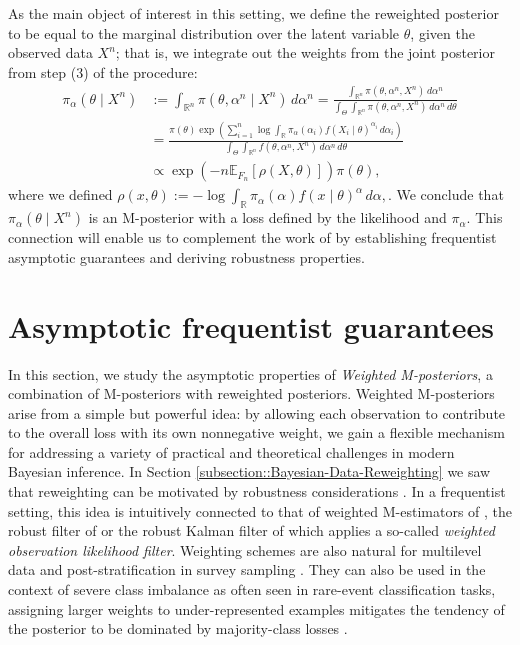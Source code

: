\documentclass[11pt, oneside]{amsart}
\theoremstyle{definition}   %
\newcommand{\R}{\mathbb{R}}
\newcommand{\loss}{\rho}
\begin{document}
%
As the main object of interest in this setting, we define the reweighted posterior to be equal to the marginal distribution over the latent variable \( \theta \), given the observed data \( X^n\); that is, we integrate out the weights from the joint posterior from step (3) of the procedure:
%
\begin{align}
\label{def::alpha-posterior}
 \nonumber   \pi_\alpha(\theta \mid X^n) &:= \int_{\R^n} \pi(\theta, \alpha^n \mid X^n) \, d\alpha^n= \frac{\int_{\R^n} \pi(\theta, \alpha^n, X^n) \, d\alpha^n }{\int_{\Theta} \int_{\R^n} \pi(\theta, \alpha^n, X^n) \, d\alpha^n \, d\theta}\\
 \nonumber &= \frac{\pi(\theta) \exp \left ( \sum_{i=1}^n \log \int_\R \pi_\alpha(\alpha_i) f(X_i \mid \theta)^{\alpha_i} \, d\alpha_i \right ) }{\int_{\Theta} \int_{\R^n} f(\theta, \alpha^n, X^n) \, d\alpha^n \, d\theta}\\
 &  \propto  \exp \left ( - n\mathbb{E}_{F_n}[\loss(X, \theta) ]\right )\pi(\theta),
\end{align}
%
where  we defined 
\(
    \loss (x, \theta) := -\log \int_\R \pi_\alpha(\alpha) f(x \mid \theta)^\alpha \, d\alpha,
\). We conclude that $\pi_\alpha(\theta \mid X^n)$ is an M-posterior with a loss defined by the likelihood and $\pi_\alpha$. This connection will enable us to complement the work of \cite{wang:kucukelbir:blei2017} by establishing frequentist asymptotic guarantees and deriving robustness properties.

%
%
\section{Asymptotic frequentist guarantees}
\label{Sec::Asymptotics}

In this section, we study the asymptotic properties of \emph{Weighted M-posteriors}, a combination of M-posteriors with reweighted posteriors.
%
Weighted M-posteriors arise from a simple but powerful idea: by allowing each observation to contribute to the overall loss with its own nonnegative weight, we gain a flexible mechanism for addressing a variety of practical and theoretical challenges in modern Bayesian inference. In Section \ref{subsection::Bayesian-Data-Reweighting} we saw that reweighting can be motivated by robustness considerations \cite{wang:kucukelbir:blei2017}. In a frequentist setting, this idea is intuitively connected to that of weighted M-estimators of \cite{field:smith1994,markatou:basu:lindsay1997, markatou:basu:lendsay1998, markatou2000}, the robust filter of \cite{calvet:czellar:ronchetti2015} or the robust  Kalman filter of \cite{duran:altamirano:shestopaloff:sanchez:knoblauch:jones:briol:murphy2024} which applies a so-called \textit{weighted observation likelihood filter}. Weighting schemes are also natural for multilevel data and post-stratification in survey sampling \citep{gelman:hill2007}. They can also be used in the context of severe class imbalance  as often seen in rare-event classification tasks, assigning larger weights to under-represented examples mitigates the tendency of the posterior to be dominated by majority-class losses \citep{rosenblattetal2025}. 
\end{document}
